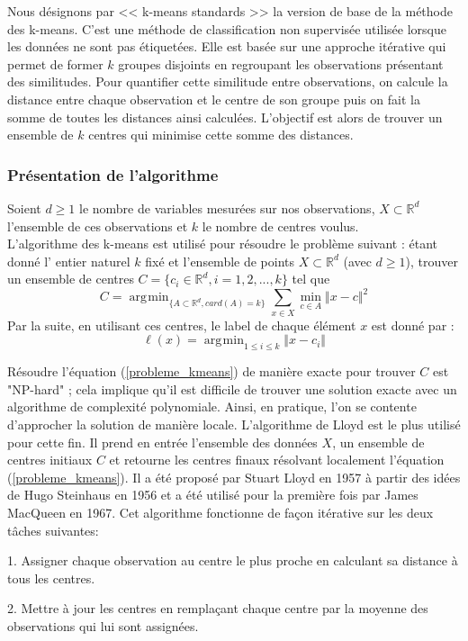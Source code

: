 \documentclass[12pt,a4paper]{book}
\newcommand{\R}{\mathbb{R}}
\newcommand{\1}{\mathds{1}}
\DeclareMathOperator*{\argmin}{arg\!\min}
\begin{document}
Nous désignons par << k-means standards >> la version de base de la méthode des k-means. C'est une méthode de classification non supervisée utilisée lorsque les données ne sont pas étiquetées. Elle est basée sur une approche itérative qui permet de former $k$ groupes disjoints en regroupant les observations présentant des similitudes. Pour quantifier cette similitude entre observations, on calcule la distance entre chaque observation et le centre de son groupe puis on fait la somme de toutes les distances ainsi calculées. L'objectif est alors de trouver un ensemble de $k$ centres qui minimise cette somme des distances.

\subsubsection{Présentation de l'algorithme}

Soient $d \geq 1$ le nombre de variables mesurées sur nos observations, $X \subset \R^d $ l'ensemble de ces observations et $k$ le nombre de centres voulus.\\
L'algorithme des k-means est utilisé pour résoudre le problème suivant : étant donné l' entier naturel $k$ fixé et l'ensemble de points $X \subset \R^d$ (avec $d \geq 1$), trouver un ensemble de centres $C = \{ c_i \in \R^d, i=1,2,...,k \}$ tel que 
\begin{equation}\label{probleme_kmeans}
	C = \argmin_{\{ A \subset \R^d, card(A)=k \}}\sum_{x \in X} \min_{c \in A} \Vert x-c \Vert^2
\end{equation}
Par la suite, en utilisant ces centres, le label de chaque élément $x$ est donné par :
$$
	\ell (x) = \argmin_{1 \leq i \leq k} \Vert x - c_i \Vert
$$

Résoudre l'équation (\ref{probleme_kmeans}) de manière exacte pour trouver $C$  est "NP-hard" ; cela implique qu'il est difficile de trouver une solution exacte avec un algorithme de complexité polynomiale. Ainsi, en pratique, l'on se contente d'approcher la solution de manière locale. L'algorithme de Lloyd est le plus utilisé pour cette fin. Il prend en entrée l'ensemble des données $X$, un ensemble de centres initiaux $C$  et retourne les centres finaux résolvant localement l'équation (\ref{probleme_kmeans}). Il a été proposé par Stuart Lloyd en 1957 à partir des idées de Hugo Steinhaus en 1956 et a été utilisé pour la première fois par James MacQueen en 1967. Cet algorithme fonctionne de façon itérative sur les deux tâches suivantes:
\begin{description}
  \item 1. Assigner chaque observation au centre le plus proche en calculant sa distance à tous les centres.
  \item 2. Mettre à jour les centres en remplaçant chaque centre par la moyenne des observations qui lui sont assignées.

\end{description}
\end{document}
